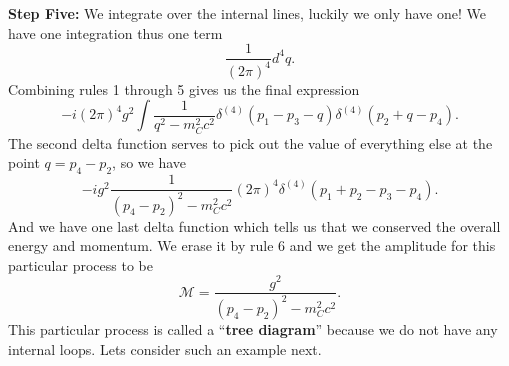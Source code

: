 \textbf{Step Five:} We integrate over the internal lines, luckily we only have one! We have one integration thus one term
\begin{equation*}
\frac{1}{(2\pi)^4}d^{4}q.
\end{equation*}
Combining rules 1 through 5 gives us the final expression
\begin{equation}
-i(2\pi)^4g^2\int\frac{1}{q^2-m_{C}^2c^2}\delta^{(4)}(p_1 - p_3 - q)\delta^{(4)}(p_{2}+q-p_{4}).
\end{equation}
The second delta function serves to pick out the value of everything else at the
point $q=p_4-p_2$, so we have
\begin{equation}
-ig^2\frac{1}{(p_4-p_2)^2-m_{C}^2c^2}(2\pi)^4\delta^{(4)}(p_1+p_2-p_3-p_4).
\end{equation}
And we have one last delta function which tells us that we conserved the
overall energy and momentum. We erase it by rule 6 and we get the amplitude for
this particular process to be
\begin{equation}
\mathcal{M} = \frac{g^2}{(p_4-p_2)^2 - m_{C}^2c^2}.
\end{equation}
This particular process is called a ``\textbf{tree diagram}'' because we
do not have any internal loops. Lets consider such an example next.
